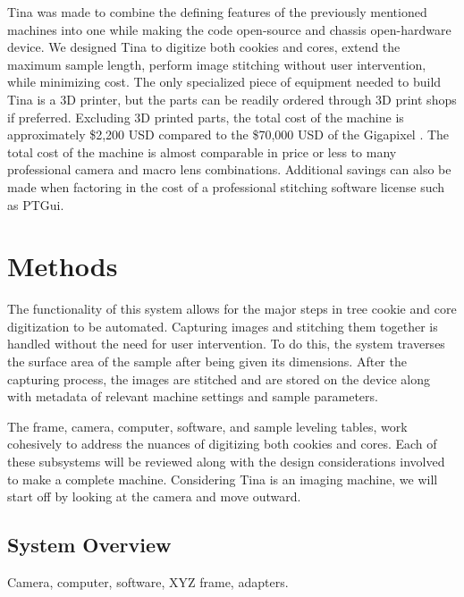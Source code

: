 \documentclass[a4paper,12pt]{article}
\begin{document}
Tina was made to combine the defining features of the previously mentioned machines into one while making the code open-source and chassis open-hardware device. 
We designed Tina to digitize both cookies and cores, extend the maximum sample length, perform image stitching without user intervention, while minimizing cost. 
The only specialized piece of equipment needed to build Tina is a 3D printer, but the parts can be readily ordered through 3D print shops if preferred.
Excluding 3D printed parts, the total cost of the machine is approximately \$2,200 USD compared to the \$70,000 USD of the Gigapixel \citep{griffin_gigapixel_2021}.
The total cost of the machine is almost comparable in price or less to many professional camera and macro lens combinations.
Additional savings can also be made when factoring in the cost of a professional stitching software license such as PTGui. 

\section{Methods}
The functionality of this system allows for the major steps in tree cookie and core digitization to be automated. Capturing images and stitching them together is handled without the need for user intervention. 
To do this, the system traverses the surface area of the sample after being given its dimensions. After the capturing process, the images are stitched and are stored on the device along with metadata of relevant machine
settings and sample parameters. 

The frame, camera, computer, software, and sample leveling tables, work cohesively to address the nuances of digitizing both cookies and cores. 
Each of these subsystems will be reviewed along with the design considerations involved to make a complete machine. 
Considering Tina is an imaging machine, we will start off by looking at the camera and move outward.

\subsection{System Overview}
Camera, computer, software, XYZ frame, adapters. 
\end{document}
